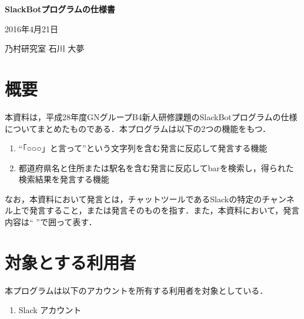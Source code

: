 \documentclass[fleqn, 14pt]{extarticlej}
\begin{document}
\begin{center}
  {\Large {\bf SlackBotプログラムの仕様書}}

\end{center}
\begin{flushright}
  2016年4月21日

  乃村研究室 石川 大夢
\end{flushright}


\section{概要}
本資料は，平成28年度GNグループB4新人研修課題のSlackBotプログラムの仕様
についてまとめたものである．本プログラムは以下の2つの機能をもつ．
\begin{enumerate}
\item ``「○○○」と言って''という文字列を含む発言に反応して発言する機能
\item 都道府県名と住所または駅名を含む発言に反応してbarを検索し，得られた検索結果を発言する機能
\end{enumerate}
なお，本資料において発言とは，チャットツールであるSlackの特定のチャンネル上で発言すること，または発言そのものを指す．また，本資料において，発言内容は`` ''で囲って表す．

\section{対象とする利用者}
本プログラムは以下のアカウントを所有する利用者を対象としている．
\begin{enumerate}
\item Slack アカウント
\end{enumerate}


\end{document}
